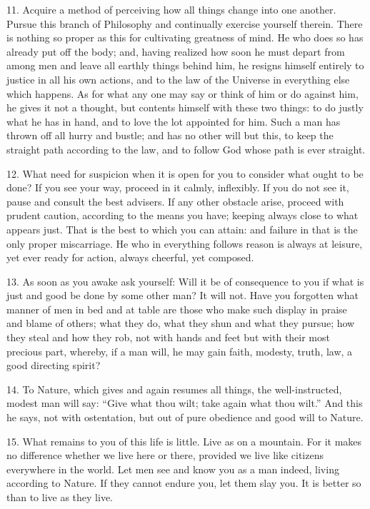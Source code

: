 \documentclass{book}
\begin{document}
11. Acquire a method of perceiving how all things change into one
another. Pursue this branch of Philosophy and continually exercise
yourself therein. There is nothing so proper as this for cultivating
greatness of mind. He who does so has already put off the body; and,
having realized how soon he must depart from among men and leave all
earthly things behind him, he resigns himself entirely to justice in
all his own actions, and to the law of the Universe in everything else
which happens. As for what any one may say or think of him or do
against him, he gives it not a thought, but contents himself with
these two things: to do justly what he has in hand, and to love the
lot appointed for him. Such a man has thrown off all hurry and bustle;
and has no other will but this, to keep the straight path according to
the law, and to follow God whose path is ever straight.

12. What need for suspicion when it is open for you to consider what
ought to be done? If you see your way, proceed in it calmly,
inflexibly. If you do not see it, pause and consult the best
advisers. If any other obstacle arise, proceed with prudent caution,
according to the means you have; keeping always close to what appears
just. That is the best to which you can attain: and failure in that is
the only proper miscarriage. He who in everything follows reason is
always at leisure, yet ever ready for action, always cheerful, yet
composed.

13. As soon as you awake ask yourself: Will it be of consequence to
you if what is just and good be done by some other man? It will
not. Have you forgotten what manner of men in bed and at table are
those who make such display in praise and blame of others; what they
do, what they shun and what they pursue; how they steal and how they
rob, not with hands and feet but with their most precious part,
whereby, if a man will, he may gain faith, modesty, truth, law, a good
directing spirit?

14. To Nature, which gives and again resumes all things, the
well-instructed, modest man will say: ``Give what thou wilt; take again
what thou wilt.'' And this he says, not with ostentation, but out of
pure obedience and good will to Nature.

15. What remains to you of this life is little. Live as on a
mountain. For it makes no difference whether we live here or there,
provided we live like citizens everywhere in the world. Let men see
and know you as a man indeed, living according to Nature. If they
cannot endure you, let them slay you. It is better so than to live as
they live.
\end{document}
